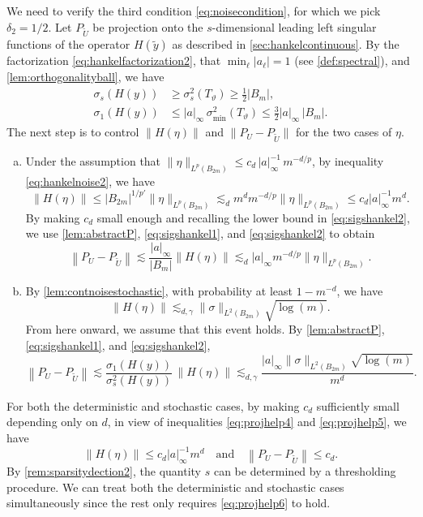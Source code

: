 \documentclass[11pt]{article}
\theoremstyle{definition}
\numberwithin{theorem}{section}
\numberwithin{lemma}{section}
\numberwithin{equation}{section}
\renewcommand{\tilde}{\widetilde}
\def\andspace{\quad\text{and}\quad}
\newcommand{\norm}[1]{{\left\|#1\right\|}}
\numberwithin{equation}{section}
\begin{document}
		We need to verify the third condition \eqref{eq:noisecondition}, for which we pick $\delta_2=1/2$. Let $P_{\tilde U}$ be projection onto the $s$-dimensional leading left singular functions of the operator $H(\tilde y)$ as described in \cref{sec:hankelcontinuous}. By the factorization \eqref{eq:hankelfactorization2}, that  $\min_\ell |a_\ell|= 1$ (see \cref{def:spectral}), and \cref{lem:orthogonalityball}, we have 
		\begin{align}
			\sigma_s(H(y))
			&\geq \sigma_s^2 (T_{\vartheta})
			\geq \frac 12 |B_m|, 	\label{eq:sigshankel1} \\
			\sigma_1(H(y))
			&\leq |a|_\infty \,  \sigma_{\min}^2(T_\vartheta)
			\leq \frac 3 2 |a|_\infty \, |B_m|.\label{eq:sigshankel2}
		\end{align}
		The next step is to control $\|H(\eta)\|$ and $\|P_U-P_{\tilde U}\|$ for the two cases of $\eta$.
		\begin{enumerate}[(a)]
			\item 
			Under the assumption that $\|\eta\|_{L^p(B_{2m})}\leq c_d\,  |a|_\infty^{-1} \, m^{-d/p}$, by inequality \eqref{eq:hankelnoise2}, we have
			\begin{equation*}
			\|H(\eta)\|
			\leq |B_{2m}|^{1/p'} \|\eta\|_{L^p(B_{2m})}
			\lesssim_d m^{d}m^{-d/p} \|\eta\|_{L^p(B_{2m})}
			\leq c_d |a|_\infty^{-1} m^d.
			\end{equation*}
			By making $c_d$ small enough and recalling the lower bound in \eqref{eq:sigshankel2}, we use \cref{lem:abstractP}, \eqref{eq:sigshankel1}, and \eqref{eq:sigshankel2} to obtain
			\begin{equation}
				\label{eq:projhelp4}
				\norm{P_U-P_{\tilde U}}
				\lesssim \frac{|a|_\infty}{|B_m|} \|H(\eta)\|
				\lesssim_d |a|_\infty m^{-d/p} \|\eta\|_{L^p(B_{2m})}.
			\end{equation}
        \item 
		By \cref{lem:contnoisestochastic}, with probability at least $1-m^{-d}$, we have
        $$
        \|H(\eta)\|
        \lesssim_{d,\gamma} \|\sigma\|_{L^2(B_{2m})} \sqrt{\log(m)}.
        $$
        From here onward, we assume that this event holds. By \cref{lem:abstractP}, \eqref{eq:sigshankel1}, and \eqref{eq:sigshankel2},
		\begin{equation}
			\label{eq:projhelp5}
			\norm{P_U-P_{\tilde U}}
			\lesssim \frac{\sigma_1(H(y))}{\sigma_s^2(H(y))} \, \|H(\eta)\|
			\lesssim_{d,\gamma} \frac{|a|_\infty \|\sigma\|_{L^2(B_{2m})} \sqrt{\log(m)}}{{ m^d}}.
		\end{equation}
		\end{enumerate}
		For both the deterministic and stochastic cases, by making $c_d$ sufficiently small depending only on $d$, in view of inequalities \eqref{eq:projhelp4} and \eqref{eq:projhelp5}, we have
		\begin{equation}
			\label{eq:projhelp6}
            \|H(\eta)\|
            \leq c_d |a|_\infty^{-1} m^d \andspace 
			\norm{P_U-P_{\tilde U}}
			\leq c_d.
		\end{equation}
		By \cref{rem:sparsitydection2}, the quantity $s$ can be determined by a thresholding procedure. We can treat both the deterministic and stochastic cases simultaneously since the rest only requires \eqref{eq:projhelp6} to hold. 
\end{document}
